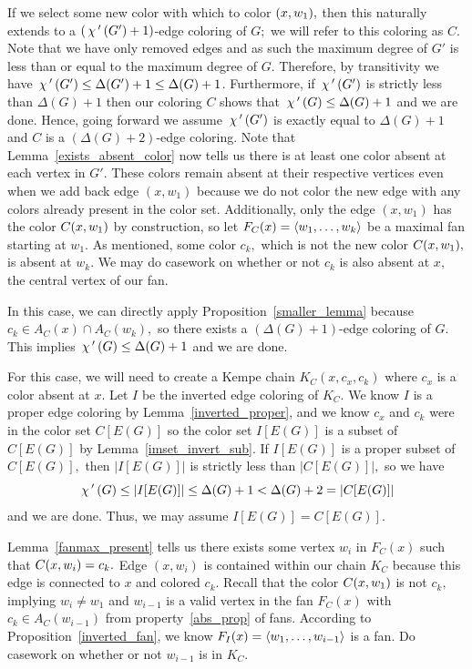 If we select some new color with which to color $(x, w_1),$ then this naturally extends to a $(\,\chi\,'\,(G') + 1)$-edge coloring of $G;$ we will refer to this coloring as $C.$ Note that we have only removed edges and as such the maximum degree of $G'$ is less than or equal to the maximum degree of $G$. Therefore, by transitivity we have $\,\chi\,'\,(G') \leq \Delta(G') + 1 \leq \Delta(G) + 1$. Furthermore, if $\,\chi\,'\,(G')$ is strictly less than $\Delta(G) + 1$ then our coloring $C$ shows that $\,\chi\,'\,(G) \leq \Delta(G)+1$ and we are done. Hence, going forward we assume $\,\chi\,'\,(G')$ is exactly equal to $\Delta(G) + 1$ and $C$ is a $(\Delta(G)+2)$-edge coloring. Note that Lemma~\ref{exists_absent_color} now tells us there is at least one color absent at each vertex in $G'.$ These colors remain absent at their respective vertices even when we add back edge $(x, w_1)$ because we do not color the new edge with any colors already present in the color set. Additionally, only the edge $(x, w_1)$ has the color $C(x, w_1)$ by construction, so let $F_C(x) = \langle w_1, \dots, w_k \rangle$ be a maximal fan starting at $w_1.$ As mentioned, some color $c_k,$ which is not the new color $C(x, w_1),$ is absent at $w_k.$ We may do casework on whether or not $c_k$ is also absent at $x,$ the central vertex of our fan.

 In this case, we can directly apply Proposition~\ref{smaller_lemma} because $c_k \in A_C(x) \cap A_C(w_k),$ so there exists a $(\Delta(G)+1)$-edge coloring of $G.$ This implies $\,\chi\,'\,(G) \leq \Delta(G)+1$ and we are done.

 For this case, we will need to create a Kempe chain $K_C(x, c_x, c_k)$ where $c_x$ is a color absent at $x.$ Let $I$ be the inverted edge coloring of $K_C$. We know $I$ is a proper edge coloring by Lemma~\ref{inverted_proper}, and we know $c_x$ and $c_k$ were in the color set $C[E(G)]$ so the color set $I[E(G)]$ is a subset of $C[E(G)]$ by Lemma~\ref{imset_invert_sub}. If $I[E(G)]$ is a proper subset of $C[E(G)],$ then $|I[E(G)]|$ is strictly less than $|C[E(G)]|,$ so we have $$\,\chi\,'\,(G) \leq |I[E(G)]| \leq \Delta(G) + 1 < \Delta(G) + 2 = |C[E(G)]|$$ and we are done. Thus, we may assume $I[E(G)] = C[E(G)].$

Lemma~\ref{fanmax_present} tells us there exists some vertex $w_i$ in $F_C(x)$ such that $C(x, w_i) = c_k.$ Edge $(x, w_i)$ is contained within our chain $K_C$ because this edge is connected to $x$ and colored $c_k.$ Recall that the color $C(x, w_1)$ is not $c_k,$ implying $w_i \neq w_1$ and $w_{i-1}$ is a valid vertex in the fan $F_C(x)$ with $c_k \in A_C(w_{i-1})$ from property~\ref{abs_prop} of fans. According to Proposition~\ref{inverted_fan}, we know $F_I(x) = \langle w_1, \dots, w_{i-1} \rangle$ is a fan. Do casework on whether or not $w_{i-1}$ is in $K_C.$ 

